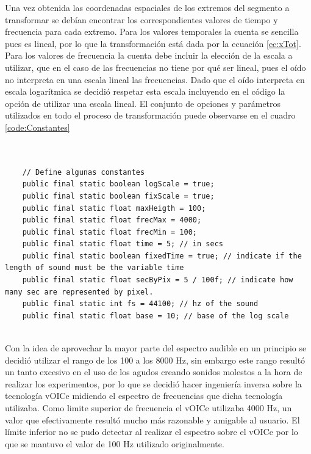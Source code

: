 \documentclass{article}
\numberwithin{figure}{section}
\begin{document}
    Una vez obtenida las coordenadas espaciales de los extremos del segmento a transformar se debían encontrar los correspondientes valores de tiempo y frecuencia para cada extremo. Para los valores temporales la cuenta se sencilla pues es lineal, por lo que la transformación está dada por la ecuación \ref{ec:xTot}. Para los valores de frecuencia la cuenta debe incluir la elección de la escala a utilizar, que en el caso de las frecuencias no tiene por qué ser lineal, pues el oído no interpreta en una escala lineal las frecuencias. Dado que el oído interpreta en escala logarítmica se decidió respetar esta escala incluyendo en el código la opción de utilizar una escala lineal. El conjunto de opciones y parámetros utilizados en todo el proceso de transformación puede observarse en el cuadro \ref{code:Constantes}

    \begin{minipage}{\textwidth}
    \begin{lstlisting}[caption=Constantes y parámetros utilizados en el código que crea y transforma la información geométrica en el estímulo sonoro., label=code:Constantes]
    
    
    // Define algunas constantes
	public final static boolean logScale = true;
	public final static boolean fixScale = true;
	public final static float maxHeigth = 100;
	public final static float frecMax = 4000;
	public final static float frecMin = 100;
	public final static float time = 5; // in secs
	public final static boolean fixedTime = true; // indicate if the length of sound must be the variable time
	public final static float secByPix = 5 / 100f; // indicate how many sec are represented by pixel.
	public final static int fs = 44100; // hz of the sound
	public final static float base = 10; // base of the log scale
    
    \end{lstlisting}
    \end{minipage}
    
    Con la idea de aprovechar la mayor parte del espectro audible en un principio se decidió utilizar el rango de los 100 a los 8000 Hz, sin embargo este rango resultó un tanto excesivo en el uso de los agudos creando sonidos molestos a la hora de realizar los experimentos, por lo que se decidió hacer ingeniería inversa sobre la tecnología vOICe midiendo el espectro de frecuencias que dicha tecnología utilizaba. Como limite superior de frecuencia el vOICe utilizaba 4000 Hz, un valor que efectivamente resultó mucho más razonable y amigable al usuario. El límite inferior no se pudo detectar al realizar el espectro sobre el vOICe por lo que se mantuvo el valor de 100 Hz utilizado originalmente. 
    
\end{document}
